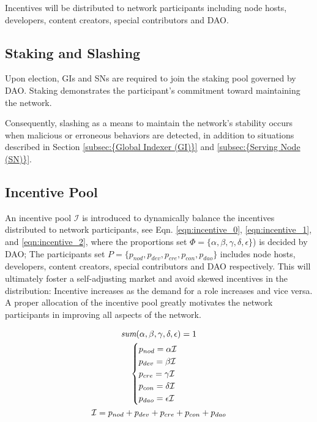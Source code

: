 Incentives will be distributed to network participants including node hosts, developers, content creators, special contributors and DAO.

\subsection{Staking and Slashing}

Upon election, GIs and SNs are required to join the staking pool governed by DAO. Staking demonstrates the participant's commitment toward maintaining the network.

Consequently, slashing as a means to maintain the network's stability occurs when malicious or erroneous behaviors are detected, in addition to situations described in Section \ref{subsec:{Global Indexer (GI)}} and \ref{subsec:{Serving Node (SN)}}.

\subsection{Incentive Pool}

An incentive pool $\mathcal{I}$ is introduced to dynamically balance the incentives distributed to network participants, see Eqn. \ref{eqn:incentive_0}, \ref{eqn:incentive_1}, and \ref{eqn:incentive_2}, where the proportions set $\Phi=\{\alpha, \beta, \gamma, \delta, \epsilon\}$) is decided by DAO; The participants set $P = \{p_{nod}, p_{dev}, p_{cre}, p_{con}, p_{dao}\}$ includes node hosts, developers, content creators, special contributors and DAO respectively. This will ultimately foster a self-adjusting market and avoid skewed incentives in the distribution: Incentive increases as the demand for a role increases and vice versa. A proper allocation of the incentive pool greatly motivates the network participants in improving all aspects of the network.

\begin{gather}
    \emph{sum}(\alpha,\beta,\gamma,\delta,\epsilon) = 1 \label{eqn:incentive_0}\\
    \begin{cases}
        p_{nod} = \alpha \mathcal{I}\\
        p_{dev} = \beta \mathcal{I}\\
        p_{cre} = \gamma \mathcal{I}\\
        p_{con} = \delta \mathcal{I}\\
        p_{dao} = \epsilon \mathcal{I}
    \end{cases} \label{eqn:incentive_1}\\
    \mathcal{I} = p_{nod} + p_{dev} + p_{cre} + p_{con} + p_{dao} \label{eqn:incentive_2}
\end{gather}